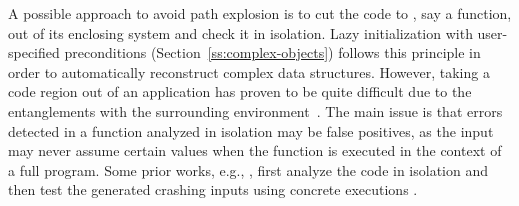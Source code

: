 A possible approach to avoid path explosion is to cut the code to , say a function, out of its enclosing system and check it in isolation. Lazy initialization with user-specified preconditions (Section~\ref{ss:complex-objects}) follows this principle in order to automatically reconstruct complex  data structures. However, taking a code region out of an application has proven to be quite difficult due to the entanglements with the surrounding environment~\cite{ED-ISSTA07}.
The main issue is that errors detected in a function analyzed in isolation may be false positives, as the input may never assume certain values when the function is executed in the context of a full program. Some prior works, e.g., \cite{CS-ICSE05}, first analyze the code in isolation and then test the generated crashing inputs using concrete executions .


